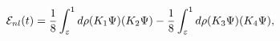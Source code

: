 \begin{equation}
\label{eint} {\cal E}_{nl}(t)=\frac{1}{8}\int_{\varepsilon}^{1}
d\rho (K_1 \Psi)(K_2 \Psi)- \frac{1}{8}\int_{\varepsilon}^{1}
d\rho (K_3 \Psi)(K_4 \Psi),
\end{equation}

